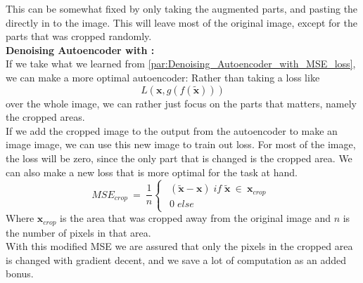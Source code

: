 	This can be somewhat fixed by only taking the augmented parts, and pasting the directly in to the image. This will leave most of the original image, except for the parts that was cropped randomly.\\
	
	\vspace{10px}
	\textbf{Denoising Autoencoder with :}\\
	If we take what we learned from \ref{par:Denoising_Autoencoder_with_MSE_loss}, we can make a more optimal autoencoder:
	Rather than taking a loss like 	
	\begin{equation}
	  L(\textbf{x},g(f(\widetilde{\textbf{x}})))
	\end{equation}
	over the whole image, we can rather just focus on the parts that matters, namely the cropped areas.\\
	
	If we add the cropped image to the output from the autoencoder to make an image image, we can use this new image to train out loss.
	For most of the image, the loss will be zero, since the only part that is changed is the cropped area. 
	We can also make a new loss that is more optimal for the task at hand. 
	\begin{equation}
	  MSE_{crop}\:=\: \frac{1}{n}
	  \begin{cases}
	      \begin{array}{lcl}
	      (\widetilde{\textbf{x}}-\textbf{x}) \; if \; \widetilde{\textbf{x}} \: \in \: \textbf{x}_{crop} \\
	      0 \; else
	      \end{array}
	  \end{cases}
	\end{equation}
	Where $\textbf{x}_{crop}$ is the area that was cropped away from the original image and $n$ is the number of pixels in that area.\\
	With this modified MSE we are assured that only the pixels in the cropped area is changed with gradient decent, and we save a lot of computation as an added bonus.
	
